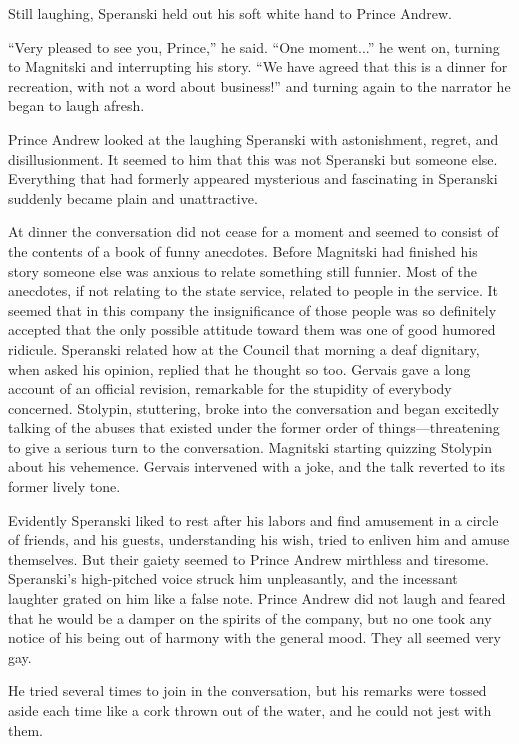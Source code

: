 Still laughing, Speranski held out his soft white hand to Prince
Andrew.

``Very pleased to see you, Prince,'' he said. ``One moment...''
he went on, turning to Magnitski and interrupting his story. ``We
have agreed that this is a dinner for recreation, with not a word
about business!'' and turning again to the narrator he began to
laugh afresh.

Prince Andrew looked at the laughing Speranski with astonishment,
regret, and disillusionment. It seemed to him that this was not
Speranski but someone else. Everything that had formerly appeared
mysterious and fascinating in Speranski suddenly became plain and
unattractive.

At dinner the conversation did not cease for a moment and seemed
to consist of the contents of a book of funny anecdotes. Before
Magnitski had finished his story someone else was anxious to
relate something still funnier. Most of the anecdotes, if not
relating to the state service, related to people in the
service. It seemed that in this company the insignificance of
those people was so definitely accepted that the only possible
attitude toward them was one of good humored ridicule. Speranski
related how at the Council that morning a deaf dignitary, when
asked his opinion, replied that he thought so too.  Gervais gave
a long account of an official revision, remarkable for the
stupidity of everybody concerned. Stolypin, stuttering, broke
into the conversation and began excitedly talking of the abuses
that existed under the former order of things---threatening to
give a serious turn to the conversation. Magnitski starting
quizzing Stolypin about his vehemence. Gervais intervened with a
joke, and the talk reverted to its former lively tone.

Evidently Speranski liked to rest after his labors and find
amusement in a circle of friends, and his guests, understanding
his wish, tried to enliven him and amuse themselves. But their
gaiety seemed to Prince Andrew mirthless and
tiresome. Speranski's high-pitched voice struck him unpleasantly,
and the incessant laughter grated on him like a false
note. Prince Andrew did not laugh and feared that he would be a
damper on the spirits of the company, but no one took any notice
of his being out of harmony with the general mood. They all
seemed very gay.

He tried several times to join in the conversation, but his
remarks were tossed aside each time like a cork thrown out of the
water, and he could not jest with them.

